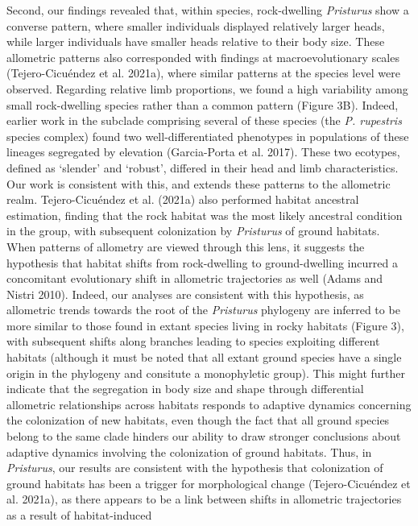 \documentclass[
  11pt,
]{article}
\begin{document}
Second, our findings revealed that, within species, rock-dwelling
\emph{Pristurus} show a converse pattern, where smaller individuals
displayed relatively larger heads, while larger individuals have smaller
heads relative to their body size. These allometric patterns also
corresponded with findings at macroevolutionary scales (Tejero-Cicuéndez
et al. 2021a), where similar patterns at the species level were
observed. Regarding relative limb proportions, we found a high
variability among small rock-dwelling species rather than a common
pattern (Figure 3B). Indeed, earlier work in the subclade comprising
several of these species (the \emph{P. rupestris} species complex) found
two well-differentiated phenotypes in populations of these lineages
segregated by elevation (Garcia-Porta et al. 2017). These two ecotypes,
defined as `slender' and `robust', differed in their head and limb
characteristics. Our work is consistent with this, and extends these
patterns to the allometric realm. Tejero-Cicuéndez et al. (2021a) also
performed habitat ancestral estimation, finding that the rock habitat
was the most likely ancestral condition in the group, with subsequent
colonization by \emph{Pristurus} of ground habitats. When patterns of
allometry are viewed through this lens, it suggests the hypothesis that
habitat shifts from rock-dwelling to ground-dwelling incurred a
concomitant evolutionary shift in allometric trajectories as well (Adams
and Nistri 2010). Indeed, our analyses are consistent with this
hypothesis, as allometric trends towards the root of the
\emph{Pristurus} phylogeny are inferred to be more similar to those
found in extant species living in rocky habitats (Figure 3), with
subsequent shifts along branches leading to species exploiting different
habitats (although it must be noted that all extant ground species have
a single origin in the phylogeny and consitute a monophyletic group).
This might further indicate that the segregation in body size and shape
through differential allometric relationships across habitats responds
to adaptive dynamics concerning the colonization of new habitats, even
though the fact that all ground species belong to the same clade hinders
our ability to draw stronger conclusions about adaptive dynamics
involving the colonization of ground habitats. Thus, in
\emph{Pristurus}, our results are consistent with the hypothesis that
colonization of ground habitats has been a trigger for morphological
change (Tejero-Cicuéndez et al. 2021a), as there appears to be a link
between shifts in allometric trajectories as a result of habitat-induced
\end{document}
